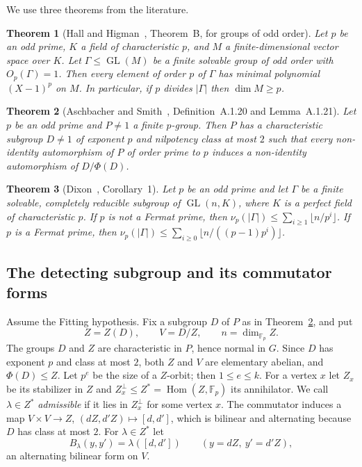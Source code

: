 \documentclass[11pt]{amsart}
\newtheorem{theorem}{Theorem}
\theoremstyle{definition}
\theoremstyle{remark}
\newcommand{\F}{\mathbb{F}}
\newcommand{\GL}{\operatorname{GL}}
\begin{document}
We use three theorems from the literature.

\begin{theorem}[Hall and Higman~\cite{HallHigman}, Theorem~B, for groups of odd order]\label{thm:HH}
Let $p$ be an odd prime, $K$ a field of characteristic $p$, and $M$ a finite-dimensional vector space over $K$. Let $\Gamma\le\GL(M)$ be a finite solvable group of odd order with $O_p(\Gamma)=1$. Then every element of order $p$ of $\Gamma$ has minimal polynomial $(X-1)^p$ on $M$. In particular, if $p$ divides $|\Gamma|$ then $\dim M\ge p$.
\end{theorem}


\begin{theorem}[Aschbacher and Smith~\cite{AS}, Definition~A.1.20 and Lemma~A.1.21]\label{thm:AS}
Let $p$ be an odd prime and $P\ne1$ a finite $p$-group. Then $P$ has a characteristic subgroup $D\ne1$ of exponent $p$ and nilpotency class at most $2$ such that every non-identity automorphism of $P$ of order prime to $p$ induces a non-identity automorphism of $D/\Phi(D)$.
\end{theorem}


\begin{theorem}[Dixon~\cite{Dixon}, Corollary~1]\label{thm:Dixon}
Let $p$ be an odd prime and let $\Gamma$ be a finite solvable, completely reducible subgroup of $\GL(n,K)$, where $K$ is a perfect field of characteristic $p$. If $p$ is not a Fermat prime, then $\nu_p(|\Gamma|)\le\sum_{i\ge1}\lfloor n/p^i\rfloor$. If $p$ is a Fermat prime, then $\nu_p(|\Gamma|)\le\sum_{i\ge0}\lfloor n/((p-1)p^i)\rfloor$.
\end{theorem}


\subsection{The detecting subgroup and its commutator forms}

Assume the Fitting hypothesis. Fix a subgroup $D$ of $P$ as in Theorem~\ref{thm:AS}, and put
\[
Z=Z(D),\qquad V=D/Z,\qquad n=\dim_{\F_p}Z .
\]
The groups $D$ and $Z$ are characteristic in $P$, hence normal in $G$. Since $D$ has exponent $p$ and class at most $2$, both $Z$ and $V$ are elementary abelian, and $\Phi(D)\le Z$. Let $p^e$ be the size of a $Z$-orbit; then $1\le e\le k$. For a vertex $x$ let $Z_x$ be its stabilizer in $Z$ and $Z_x^\perp\le Z^*=\operatorname{Hom}(Z,\F_p)$ its annihilator. We call $\lambda\in Z^*$ \emph{admissible} if it lies in $Z_x^\perp$ for some vertex $x$. The commutator induces a map $V\times V\to Z$, $(dZ,d'Z)\mapsto[d,d']$, which is bilinear and alternating because $D$ has class at most $2$. For $\lambda\in Z^*$ let
\[
B_\lambda(y,y')=\lambda([d,d'])\qquad(y=dZ,\ y'=d'Z),
\]
an alternating bilinear form on $V$.
\end{document}
